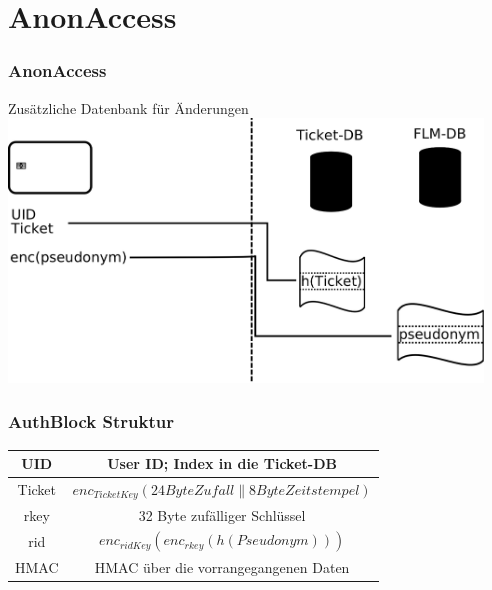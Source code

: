 \section{AnonAccess}


\begin{frame}
	\frametitle{AnonAccess}
	Zusätzliche Datenbank für Änderungen
	\includegraphics[height=7cm]{ansatz3.png}
\end{frame}



\begin{frame}
	\frametitle{AuthBlock Struktur}
\begin{tabular}{|c|c|}
\hline UID & User ID; Index in die Ticket-DB \\ 
\hline Ticket   & $enc_{TicketKey}(24 Byte Zufall \parallel 8 Byte Zeitstempel)$ \\ 
\hline rkey     & 32 Byte zufälliger Schlüssel \\ 
\hline rid      & $enc_{ridKey}\left(enc_{rkey}\left(h\left(Pseudonym\right)\right)\right)$ \\ 
\hline HMAC     & HMAC über die vorrangegangenen Daten \\ 
\hline 
\end{tabular} 
\end{frame}


